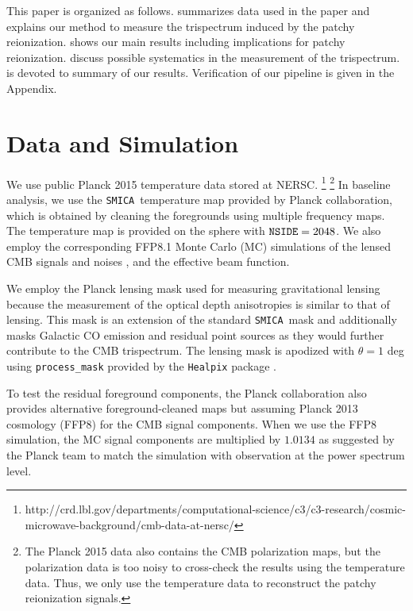 \documentclass[aps,prd,twocolumn,superscriptaddress,groupedaddress,nofootinbib]{revtex4}
\def\SMICA{{\tt SMICA}}
\begin{document}
This paper is organized as follows. 
 summarizes data used in the paper and  explains 
our method to measure the trispectrum induced by the patchy reionization. 
 shows our main results including implications for patchy reionization. 
 discuss possible systematics in the measurement of the trispectrum. 
 is devoted to summary of our results. 
Verification of our pipeline is given in the Appendix. 

\section{Data and Simulation} \label{data}

We use public Planck 2015 temperature data stored at NERSC. 
\footnote{http://crd.lbl.gov/departments/computational-science/c3/c3-research/cosmic-microwave-background/cmb-data-at-nersc/}
\footnote{The Planck 2015 data also contains the CMB polarization maps, but the polarization data is 
too noisy to cross-check the results using the temperature data. 
Thus, we only use the temperature data to reconstruct the patchy reionization signals.}
In baseline analysis, we use the \SMICA\ temperature map provided by Planck collaboration, 
which is obtained by cleaning the foregrounds using multiple frequency maps. 
The temperature map is provided on the sphere with $\text{{\tt NSIDE}}=2048$. 
We also employ the corresponding FFP8.1 Monte Carlo (MC) simulations of 
the lensed CMB signals and noises \cite{FFP8}, and the effective beam function.

We employ the Planck lensing mask used for measuring gravitational lensing \cite{P15:phi} because 
the measurement of the optical depth anisotropies is similar to that of lensing. 
This mask is an extension of the standard \SMICA\ mask and additionally masks Galactic CO emission and 
residual point sources as they would further contribute to the CMB trispectrum. 
The lensing mask is apodized with $\theta=1$ deg using {\tt process\_mask} provided by 
the {\tt Healpix} package \cite{Gorski:2004by}.

To test the residual foreground components, the Planck collaboration also provides 
alternative foreground-cleaned maps but assuming Planck 2013 cosmology (FFP8) for the CMB signal components. 
When we use the FFP8 simulation, the MC signal components are multiplied by $1.0134$ 
as suggested by the Planck team to match the simulation with observation at the power spectrum level. 
\end{document}
